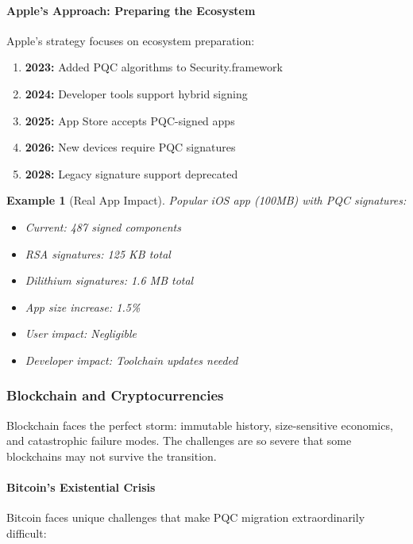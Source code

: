 \documentclass[11pt,a4paper]{article}
\newtheorem{example}{Example}
\begin{document}
\paragraph{Apple's Approach: Preparing the Ecosystem}

Apple's strategy focuses on ecosystem preparation:

\begin{enumerate}
    \item \textbf{2023:} Added PQC algorithms to Security.framework
    \item \textbf{2024:} Developer tools support hybrid signing
    \item \textbf{2025:} App Store accepts PQC-signed apps
    \item \textbf{2026:} New devices require PQC signatures
    \item \textbf{2028:} Legacy signature support deprecated
\end{enumerate}

\begin{example}[Real App Impact]
Popular iOS app (100MB) with PQC signatures:
\begin{itemize}
    \item Current: 487 signed components
    \item RSA signatures: 125 KB total
    \item Dilithium signatures: 1.6 MB total
    \item App size increase: 1.5\%
    \item User impact: Negligible
    \item Developer impact: Toolchain updates needed
\end{itemize}
\end{example}

\subsubsection{Blockchain and Cryptocurrencies}

Blockchain faces the perfect storm: immutable history, size-sensitive economics, and catastrophic failure modes. The challenges are so severe that some blockchains may not survive the transition.

\paragraph{Bitcoin's Existential Crisis}

Bitcoin faces unique challenges that make PQC migration extraordinarily difficult:
\end{document}
